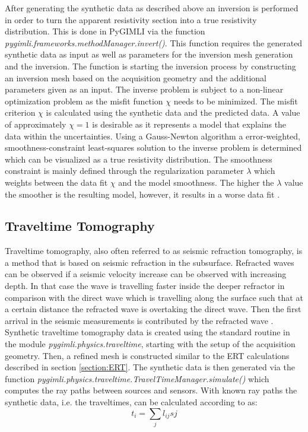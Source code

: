 After generating the synthetic data as described above an inversion is performed in order to turn the apparent resistivity section into a true resistivity distribution. This is done in PyGIMLI via the function \textit{pygimli.frameworks.methodManager.invert()}. This function requires the generated synthetic data as input as well as parameters for the inversion mesh generation and the inversion. The function is starting the inversion process by constructing an inversion mesh based on the acquisition geometry and the additional parameters given as an input. The inverse problem is subject to a non-linear optimization problem as the misfit function $\chi$ needs to be minimized. The misfit criterion $\chi$ is calculated using the synthetic data and the predicted data. A value of approximately $\chi=1$ is desirable as it represents a model that explains the data within the uncertainties. Using a Gauss-Newton algorithm a error-weighted, smoothness-constraint least-squares solution to the inverse problem is determined which can be visualized as a true resistivity distribution. The smoothness constraint is mainly defined through the regularization parameter $\lambda$ which weights between the data fit $\chi$ and the model smoothness. The higher the $\lambda$ value the smoother is the resulting model, however, it results in a worse data fit \citep{Ruecker2017}.

\subsection{Traveltime Tomography}\label{section:TT}
Traveltime tomography, also often referred to as seismic refraction tomography, is a method that is based on seismic refraction in the subsurface. Refracted waves can be observed if a seismic velocity increase can be observed with increasing depth. In that case the wave is travelling faster inside the deeper refractor in comparison with the direct wave which is travelling along the surface such that at a certain distance the refracted wave is overtaking the direct wave. Then the first arrival in the seismic measurements is contributed by the refracted wave \citep{kearey2002introduction}. Synthetic traveltime tomography data is created using the standard routine in the module \textit{pygimli.physics.traveltime}, starting with the setup of the acquisition geometry. Then, a refined mesh is constructed similar to the ERT calculations described in section \ref{section:ERT}. The synthetic data is then generated via the function \textit{pygimli.physics.traveltime.TravelTimeManager.simulate()} which computes the ray paths between sources and sensors. With known ray paths the synthetic data, i.e. the traveltimes, can be calculated according to \citet{zelt2021traveltime} as:
\begin{equation}
    t_i = \sum_j l_{ij}sj
    \label{Eq:TT}
\end{equation}


